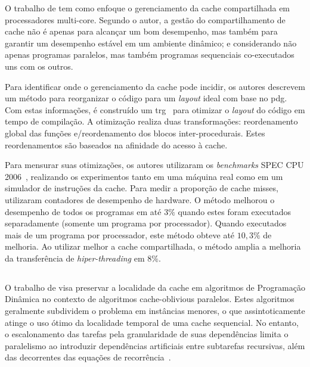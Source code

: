 O trabalho de  tem como enfoque o gerenciamento da cache compartilhada em processadores multi-core.
Segundo o autor, a gestão do compartilhamento de cache não é apenas para alcançar um bom desempenho, mas também para garantir um desempenho estável em um ambiente dinâmico; e considerando não apenas programas paralelos, mas também programas sequenciais co-executados uns com os outros.

Para identificar onde o gerenciamento da cache pode incidir, os autores descrevem um método para reorganizar o código para um \textit{layout} ideal com base no \ac{pdg}.
Com estas informações, é construído um \ac{trg}~\cite{gloy1999procedure} para otimizar o \textit{layout} do código em tempo de compilação.
A otimização realiza duas transformações: reordenamento global das funções e\@/\@ou reordenamento dos blocos inter-procedurais. Estes reordenamentos são baseados na afinidade do acesso à cache.

Para mensurar suas otimizações, os autores utilizaram os \textit{benchmarks} SPEC CPU 2006~\cite{spec2006}, realizando os experimentos tanto em uma máquina real como em um simulador de instruções da cache. Para medir a proporção de cache misses, utilizaram contadores de desempenho de hardware.
O método melhorou o desempenho de todos os programas em até $3\%$ quando estes foram executados separadamente (somente um programa por processador).
Quando executados mais de um programa por processador, este método obteve até $10,3\%$ de melhoria. Ao utilizar melhor a cache compartilhada, o método amplia a melhoria da transferência de \textit{hiper-threading} em $8\%$.

\subsection{}

O trabalho de  visa preservar a localidade da cache em algoritmos de Programação Dinâmica no contexto de algoritmos cache-oblivious paralelos.
Estes algoritmos geralmente subdividem o problema em instâncias menores, o que assintoticamente atinge o uso ótimo da localidade temporal de uma cache sequencial.
No entanto, o escalonamento das tarefas pela granularidade de suas dependências limita o paralelismo ao introduzir dependências artificiais entre subtarefas recursivas, além das decorrentes das equações de recorrência~\cite{Tang2015}.


